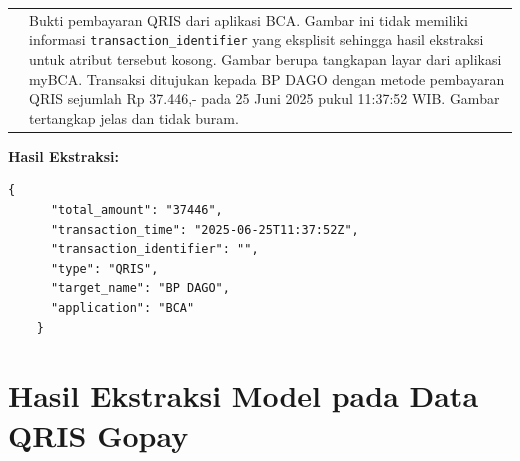 \begin{table}[h!]
\begin{tabularx}{\textwidth}{m{} X}
        & 
        Bukti pembayaran QRIS dari aplikasi BCA. Gambar ini tidak memiliki informasi \texttt{transaction\_identifier} yang eksplisit sehingga hasil ekstraksi untuk atribut tersebut kosong. Gambar berupa tangkapan layar dari aplikasi myBCA. Transaksi ditujukan kepada BP DAGO dengan metode pembayaran QRIS sejumlah Rp 37.446,- pada 25 Juni 2025 pukul 11:37:52 WIB. Gambar tertangkap jelas dan tidak buram. \\
    \end{tabularx}
\end{table}

\textbf{Hasil Ekstraksi:}
\begin{lstlisting}[style=jsonstyle]
    {
      "total_amount": "37446",
      "transaction_time": "2025-06-25T11:37:52Z",
      "transaction_identifier": "",
      "type": "QRIS",
      "target_name": "BP DAGO",
      "application": "BCA"
    }
\end{lstlisting}

\clearpage

\section{Hasil Ekstraksi Model pada Data QRIS Gopay}

